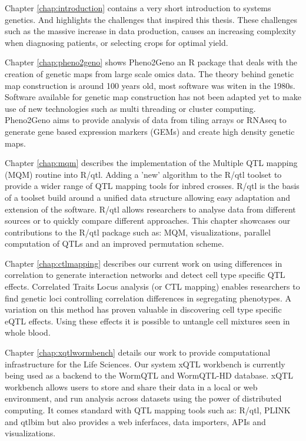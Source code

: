 \documentclass[11pt, twoside]{extbook}
\begin{document}
Chapter \ref{chap:introduction} contains a very short introduction to systems genetics. And highlights 
the challenges that inspired this thesis. These challenges such as the massive increase in data production, 
causes an increasing complexity when diagnosing patients, or selecting crops for optimal yield.

Chapter \ref{chap:pheno2geno} shows Pheno2Geno an R package that deals with the creation of 
genetic maps from large scale omics data. The theory behind genetic map construction is around 
100 years old, most software was witen in the 1980s. Software available for genetic map construction 
has not been adapted yet to make use of new technologies such as multi threading or cluster 
computing. Pheno2Geno aims to provide analysis of data from tiling arrays or RNAseq to generate 
gene based expression markers (GEMs) and create high density genetic maps.

Chapter \ref{chap:mqm} describes the implementation of the Multiple QTL mapping (MQM) 
routine into R/qtl. Adding a 'new' algorithm to the R/qtl toolset to provide a wider range of 
QTL mapping tools for inbred crosses. R/qtl is the basis of a toolset build around a unified 
data structure allowing easy adaptation and extension of the software. R/qtl allows researchers 
to analyse data from different sources or to quickly compare different approaches. This chapter 
showcases our contributions to the R/qtl package such as: MQM, visualizations, parallel 
computation of QTLs and an improved permutation scheme.

Chapter \ref{chap:ctlmapping} describes our current work on using differences in correlation to 
generate interaction networks and detect cell type specific QTL effects. Correlated Traits 
Locus analysis (or CTL mapping) enables researchers to find genetic loci controlling correlation 
differences in segregating phenotypes. A variation on this method has proven valuable in 
discovering cell type specific eQTL effects. Using these effects it is possible 
to untangle cell mixtures seen in whole blood.

Chapter \ref{chap:xqtlwormbench} details our work to provide computational infrastructure for the Life Sciences. 
Our system xQTL workbench is currently being used as a backend to the WormQTL and WormQTL-HD database. xQTL workbench allows 
users to store and share their data in a local or web environment, and run analysis across 
datasets using the power of distributed computing. It comes standard with QTL mapping 
tools such as: R/qtl, PLINK and qtlbim but also provides a web inferfaces, data importers, 
APIs and visualizations.
\end{document}
